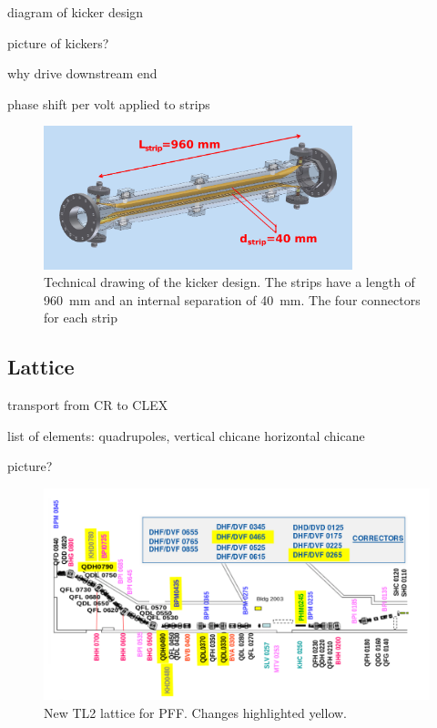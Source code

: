 diagram of kicker design

picture of kickers?

why drive downstream end

phase shift per volt applied to strips

\begin{figure}
  \centering
  \includegraphics[width=0.8\textwidth]{Figures/optics/kickerSchematic}
  \caption{Technical drawing of the kicker design. The strips have a length of 960~mm and an internal separation of 40~mm. The four connectors for each strip}
  \label{f:kickerSchematic}
\end{figure}


\subsection{Lattice}
\label{ss:tl2Lattice}

transport from CR to CLEX

list of elements: quadrupoles, vertical chicane horizontal chicane

picture?

\begin{landscape}
\begin{figure}
  \centering
  \includegraphics[width=\hsize]{Figures/optics/newTL2Lattice}
  \caption{New TL2 lattice for PFF. Changes highlighted yellow.}
  \label{f:newTL2Lattice}
\end{figure}
\end{landscape}

